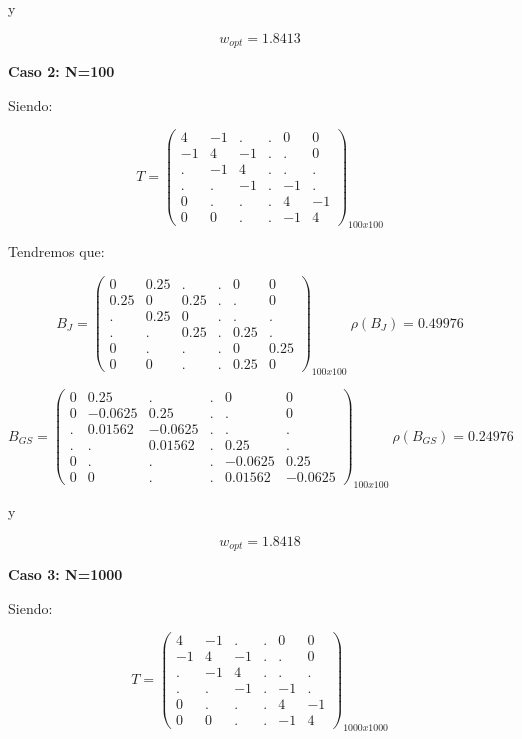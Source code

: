 y

$$
    w_{opt} = 1.8413
$$

\textbf{Caso 2: N=100}

Siendo: 

$$
    T = \begin{pmatrix}
     4 &	-1 &	 . &	 . &	 0 &	 0 \\
    -1 &	 4 &	-1 &	 . &     . &	 0 \\
     . &	-1 &	 4 &	 . &	 . &	 . \\
     . &	 . &	-1 &	 . &	-1 &	 . \\
     0 &	 . &	 . &	 . &	 4 &	-1 \\
     0 &	 0 &	 . &	 . &	-1 &	 4
    \end{pmatrix}_{100x100}
$$

Tendremos que:

$$
    B_{J} = \begin{pmatrix}
     0 &  0.25 &	 . &	 . &	 0 &	 0 \\
  0.25 &	 0 &  0.25 &	 . &     . &	 0 \\
     . &  0.25 &	 0 &	 . &	 . &	 . \\
     . &	 . &  0.25 &	 . &  0.25 &	 . \\
     0 &	 . &	 . &	 . &	 0 &  0.25 \\
     0 &	 0 &	 . &	 . &  0.25 &	 0
    \end{pmatrix}_{100x100}\ \rho(B_{J}) = 0.49976
$$

$$
    B_{GS} = \begin{pmatrix}
     0 &	0.25 &	 . &	 . &	 0 &	 0 \\
     0 &	-0.0625 & 0.25 &	 . &     . &	 0 \\
     . &	0.01562 & -0.0625 &	 . &	 . &	 . \\
     . &	 . &	0.01562 &	 . &	0.25 &	 . \\
     0 &	 . &	 . &	 . &	 -0.0625 &	0.25 \\
     0 &	 0 &	 . &	 . &	0.01562 &	 -0.0625
    \end{pmatrix}_{100x100}\ \rho(B_{GS}) = 0.24976
$$

y

$$
    w_{opt} = 1.8418
$$

\textbf{Caso 3: N=1000}

Siendo: 

$$
    T = \begin{pmatrix}
     4 &	-1 &	 . &	 . &	 0 &	 0 \\
    -1 &	 4 &	-1 &	 . &     . &	 0 \\
     . &	-1 &	 4 &	 . &	 . &	 . \\
     . &	 . &	-1 &	 . &	-1 &	 . \\
     0 &	 . &	 . &	 . &	 4 &	-1 \\
     0 &	 0 &	 . &	 . &	-1 &	 4
    \end{pmatrix}_{1000x1000}
$$

